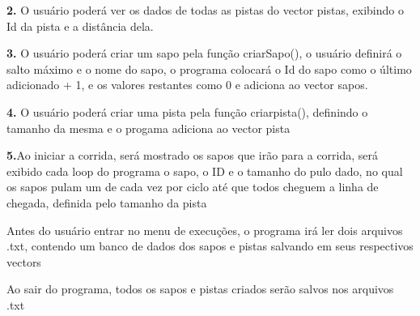 {\bfseries 2.} O usuário poderá ver os dados de todas as pistas do vector pistas, exibindo o Id da pista e a distância dela.

{\bfseries 3.} O usuário poderá criar um sapo pela função criar\+Sapo(), o usuário definirá o salto máximo e o nome do sapo, o programa colocará o Id do sapo como o último adicionado + 1, e os valores restantes como 0 e adiciona ao vector sapos.

{\bfseries 4.} O usuário poderá criar uma pista pela função criarpista(), definindo o tamanho da mesma e o progama adiciona ao vector pista

{\bfseries 5.}Ao iniciar a corrida, será mostrado os sapos que irão para a corrida, será exibido cada loop do programa o sapo, o ID e o tamanho do pulo dado, no qual os sapos pulam um de cada vez por ciclo até que todos cheguem a linha de chegada, definida pelo tamanho da pista


\begin{DoxyItemize}
\item 
\end{DoxyItemize}

Antes do usuário entrar no menu de execuções, o programa irá ler dois arquivos .txt, contendo um banco de dados dos sapos e pistas salvando em seus respectivos vectors


\begin{DoxyItemize}
\item 
\end{DoxyItemize}

Ao sair do programa, todos os sapos e pistas criados serão salvos nos arquivos .txt